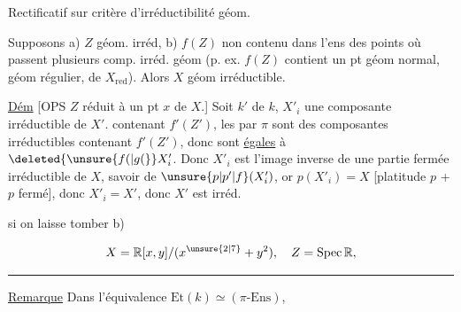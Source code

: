 Rectificatif sur critère d'irréductibilité géom.

Supposons a) $Z$ géom. irréd, b) $f(Z)$ non contenu dans l'ens des points  où passent plusieurs comp. irréd. géom (p. ex. $f(Z)$ contient un pt géom normal,   géom régulier, de $X_{\mathrm{red}}$). Alors $X$ géom irréductible.

\uline{Dém} [OPS $Z$ réduit à un pt  $x$ de $X$.]  Soit $k'$   de $k$,  $X'_i$ une composante irréductible de $X'$.   contenant $f'(Z')$, les  par $\pi$ sont des composantes irréductibles contenant $f'(Z')$, donc sont \uline{égales} à $\deleted{\unsure{f(|g(}}X'_i$.  Donc $X'_i$ est l'image inverse de une partie fermée irréductible de $X$, savoir de $\unsure{p|p'|f}(X'_i)$, or $p(X'_i)=X$ [platitude  \unsure{]|)} $p$ + $p$ fermé], donc $X'_i=X'$, donc $X'$ est irréd.

 si on laisse tomber b)

\[
X=\mathbb{R}[x,y]/(x^{\unsure{2|7}}+y^2),\quad Z=\operatorname{Spec}\mathbb{R},
\]
\par\noindent\hfill\rule{.25\linewidth}{.4pt}\hfill\strut\par
{}

\uline{Remarque} Dans l'équivalence $\mathrm{Et}(k)\simeq(\pi\text{-}\mathrm{Ens})$,   

